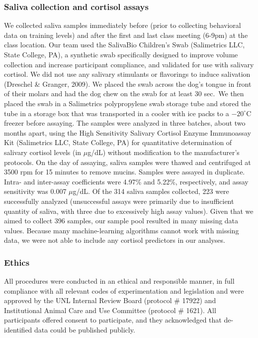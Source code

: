 \documentclass[
  english,
  ,pub,floatsintext]{apa6}
\begin{document}
\hypertarget{saliva-collection-and-cortisol-assays}{%
\subsubsection{Saliva collection and cortisol assays}\label{saliva-collection-and-cortisol-assays}}

We collected saliva samples immediately before (prior to collecting behavioral data on training levels) and after the first and last class meeting (6-9pm) at the class location. Our team used the SalivaBio Children's Swab (Salimetrics LLC, State College, PA), a synthetic swab specifically designed to improve volume collection and increase participant compliance, and validated for use with salivary cortisol. We did not use any salivary stimulants or flavorings to induce salivation (Dreschel \& Granger, 2009). We placed the swab across the dog's tongue in front of their molars and had the dog chew on the swab for at least 30 sec.~We then placed the swab in a Salimetrics polypropylene swab storage tube and stored the tube in a storage box that was transported in a cooler with ice packs to a \(-20^\circ\)C freezer before assaying. The samples were analyzed in three batches, about two months apart, using the High Sensitivity Salivary Cortisol Enzyme Immunoassay Kit (Salimetrics LLC, State College, PA) for quantitative determination of salivary cortisol levels (in \(\mu\)g/dL) without modification to the manufacturer's protocols. On the day of assaying, saliva samples were thawed and centrifuged at 3500 rpm for 15 minutes to remove mucins. Samples were assayed in duplicate. Intra- and inter-assay coefficients were 4.97\% and 5.22\%, respectively, and assay sensitivity was 0.007 \(\mu\)g/dL. Of the 314 saliva samples collected, 223 were successfully analyzed (unsuccessful assays were primarily due to insufficient quantity of saliva, with three due to excessively high assay values). Given that we aimed to collect 396 samples, our sample pool resulted in many missing data values. Because many machine-learning algorithms cannot work with missing data, we were not able to include any cortisol predictors in our analyses.

\hypertarget{ethics}{%
\subsubsection{Ethics}\label{ethics}}

All procedures were conducted in an ethical and responsible manner, in full compliance with all relevant codes of experimentation and legislation and were approved by the UNL Internal Review Board (protocol \# 17922) and Institutional Animal Care and Use Committee (protocol \# 1621). All participants offered consent to participate, and they acknowledged that de-identified data could be published publicly.
\end{document}
